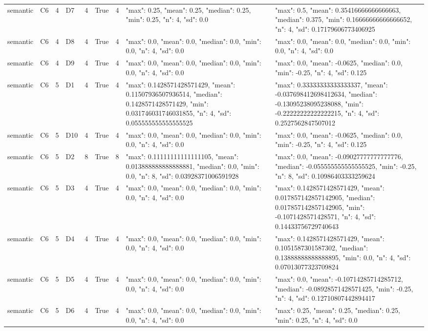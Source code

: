 \begin{tabular}{lllllllll}
semantic & C6 & 4 & D7 & 4 & True & 4 & {"max": 0.25, "mean": 0.25, "median": 0.25, "min": 0.25, "n": 4, "sd": 0.0} & {"max": 0.5, "mean": 0.35416666666666663, "median": 0.375, "min": 0.16666666666666652, "n": 4, "sd": 0.17179606773406925} \\
semantic & C6 & 4 & D8 & 4 & True & 4 & {"max": 0.0, "mean": 0.0, "median": 0.0, "min": 0.0, "n": 4, "sd": 0.0} & {"max": 0.0, "mean": 0.0, "median": 0.0, "min": 0.0, "n": 4, "sd": 0.0} \\
semantic & C6 & 4 & D9 & 4 & True & 4 & {"max": 0.0, "mean": 0.0, "median": 0.0, "min": 0.0, "n": 4, "sd": 0.0} & {"max": 0.0, "mean": -0.0625, "median": 0.0, "min": -0.25, "n": 4, "sd": 0.125} \\
semantic & C6 & 5 & D1 & 4 & True & 4 & {"max": 0.1428571428571429, "mean": 0.11507936507936514, "median": 0.1428571428571429, "min": 0.031746031746031855, "n": 4, "sd": 0.055555555555555525} & {"max": 0.33333333333333337, "mean": -0.037698412698412634, "median": -0.13095238095238088, "min": -0.22222222222222215, "n": 4, "sd": 0.2527562847507012} \\
semantic & C6 & 5 & D10 & 4 & True & 4 & {"max": 0.0, "mean": 0.0, "median": 0.0, "min": 0.0, "n": 4, "sd": 0.0} & {"max": 0.0, "mean": -0.0625, "median": 0.0, "min": -0.25, "n": 4, "sd": 0.125} \\
semantic & C6 & 5 & D2 & 8 & True & 8 & {"max": 0.11111111111111105, "mean": 0.013888888888888881, "median": 0.0, "min": 0.0, "n": 8, "sd": 0.03928371006591928} & {"max": 0.0, "mean": -0.09027777777777776, "median": -0.055555555555555525, "min": -0.25, "n": 8, "sd": 0.10986403333259624} \\
semantic & C6 & 5 & D3 & 4 & True & 4 & {"max": 0.0, "mean": 0.0, "median": 0.0, "min": 0.0, "n": 4, "sd": 0.0} & {"max": 0.1428571428571429, "mean": 0.017857142857142905, "median": 0.017857142857142905, "min": -0.1071428571428571, "n": 4, "sd": 0.14433756729740643} \\
semantic & C6 & 5 & D4 & 4 & True & 4 & {"max": 0.0, "mean": 0.0, "median": 0.0, "min": 0.0, "n": 4, "sd": 0.0} & {"max": 0.1428571428571429, "mean": 0.1051587301587302, "median": 0.13888888888888895, "min": 0.0, "n": 4, "sd": 0.07013077323709824} \\
semantic & C6 & 5 & D5 & 4 & True & 4 & {"max": 0.0, "mean": 0.0, "median": 0.0, "min": 0.0, "n": 4, "sd": 0.0} & {"max": 0.0, "mean": -0.10714285714285712, "median": -0.08928571428571425, "min": -0.25, "n": 4, "sd": 0.12710807442894417} \\
semantic & C6 & 5 & D6 & 4 & True & 4 & {"max": 0.0, "mean": 0.0, "median": 0.0, "min": 0.0, "n": 4, "sd": 0.0} & {"max": 0.25, "mean": 0.25, "median": 0.25, "min": 0.25, "n": 4, "sd": 0.0} \\

\end{tabular}
